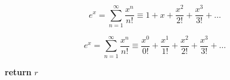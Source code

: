 \documentclass[12pt,letterpaper]{article}
\begin{document}
\vspace{5ex}

\[
  e^x = \sum^{\infty}_{n=1}{\frac{x^n}{n!}} \equiv 1 + x + \frac{x^2}{2!} + \frac{x^3}{3!} + \ldots
\]

\vspace{5ex}

\[
  e^x = \sum^{\infty}_{n=1}{\frac{x^n}{n!}} \equiv \frac{x^0}{0!} +  \frac{x^1}{1!} + \frac{x^2}{2!} + \frac{x^3}{3!} + \ldots
\]



\begin{algorithmic}
    \EndWhile
    \State \textbf{return} $r$
    \EndFunction
\end{algorithmic}



\end{document}
